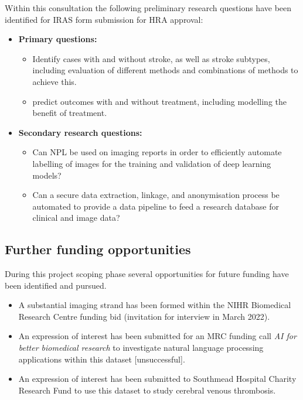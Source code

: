\documentclass{article}
\begin{document}
Within this consultation the following preliminary research questions
have been identified for IRAS form submission for HRA approval:
\begin{itemize}
\item \textbf{Primary questions:}
  \begin{itemize}
  \item Identify cases with and without stroke, as well as stroke subtypes, including evaluation of different methods and combinations of methods to achieve this.
  \item predict outcomes with and without treatment, including
    modelling the benefit of treatment.
  \end{itemize}
\item \textbf{Secondary research questions:}
  \begin{itemize}
  \item Can NPL be used on imaging reports in order to efficiently automate labelling of images for the training and validation of deep learning models?
  \item Can a secure data extraction, linkage, and anonymisation
    process be automated to provide a data pipeline to feed a
    research database for clinical and image data?
  \end{itemize}
\end{itemize}



\subsection{Further funding opportunities}

During this project scoping phase several opportunities for future
funding have been identified and pursued.
\begin{itemize}
\item A substantial imaging strand has been formed within the NIHR
  Biomedical Research Centre funding bid (invitation for interview in
  March 2022).
\item An expression of interest has been submitted for an MRC funding
  call \textit{AI for better biomedical research} to investigate natural language processing
  applications within this dataset [unsuccessful].
\item An expression of interest has been submitted to Southmead Hospital Charity
  Research Fund to use this dataset to study cerebral venous thrombosis.
\end{itemize}
\end{document}
